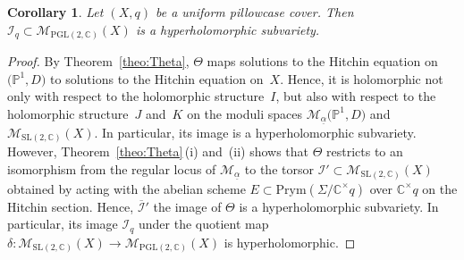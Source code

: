 \documentclass[10pt,a4paper]{amsart}
\numberwithin{equation}{section}
\newtheorem{coro}[theo]{Corollary}
\theoremstyle{definition}
\renewcommand{\to}{\rightarrow}
\newcommand{\ualpha}{\underline{\alpha}}
\newcommand{\calI}{\mathcal{I}}
\newcommand{\calM}{\mathcal{M}}
\newcommand{\CC}{\mathbb{C}}
\newcommand{\PP}{\mathbb{P}}
\newcommand{\Prym}{\mathrm{Prym}}
\newcommand{\SL}{\mathrm{SL}}
\newcommand{\PGL}{\mathrm{PGL}}
\begin{document}
\begin{coro}\label{coro:hyperholomorphic} Let $(X,q)$ be a uniform pillowcase cover. Then $\calI_q \subset \calM_{\PGL(2,\CC)}(X)$ is a hyperholomorphic subvariety.
\end{coro}
\begin{proof} By Theorem~\ref{theo:Theta}, $\Theta$ maps solutions to the Hitchin equation on $\bigl(\PP^1,D\bigr)$ to solutions to the Hitchin equation on~$X$. Hence, it is holomorphic not only with respect to the holomorphic structure~$I$, but also with respect to the holomorphic structure~$J$ and~$K$ on the moduli spaces $\calM_{\ualpha}\bigl(\PP^1,D\bigr)$ and $\calM_{\SL(2,\CC)}(X)$. In particular, its image is a hyperholomorphic subvariety. However, Theorem~\ref{theo:Theta}\,(i) and~(ii) shows that $\Theta$ restricts to an isomorphism from the regular locus of $\calM_{\ualpha}$ to the torsor $\calI' \subset \calM_{\SL(2,\CC)}(X)$ obtained by acting with the abelian scheme $E \subset \Prym(\Sigma/\CC^\times q )$ over $\CC^\times q$ on the Hitchin section. Hence, $\overline{\calI}'$ the image of $\Theta$ is a hyperholomorphic subvariety. In particular, its image $\calI_q$ under the quotient map $\delta\colon \calM_{\SL(2,\CC)}(X) \to \calM_{\PGL(2,\CC)}(X)$ is hyperholomorphic.
\end{proof}
\end{document}
